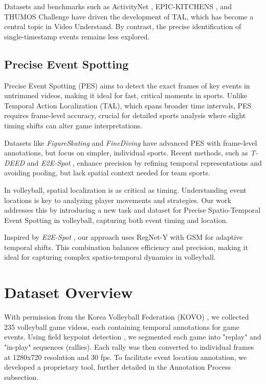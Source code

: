 \documentclass[conference]{IEEEtran}
\begin{document}
Datasets and benchmarks such as ActivityNet \cite{ActivityNet}, EPIC-KITCHENS \cite{damen2018scalingegocentricvisionepickitchens}, and THUMOS Challenge \cite{Idrees_2017} have driven the development of TAL, which has become a central topic in Video Understand. By contrast, the precise identification of single-timestamp events remains less explored.

\subsection{Precise Event Spotting}

Precise Event Spotting (PES) aims to detect the exact frames of key events in untrimmed videos, making it ideal for fast, critical moments in sports. Unlike Temporal Action Localization (TAL), which spans broader time intervals, PES requires frame-level accuracy, crucial for detailed sports analysis where slight timing shifts can alter game interpretations.

Datasets like \textit{FigureSkating} \cite{figureskating} and \textit{FineDiving} \cite{finediving} have advanced PES with frame-level annotations, but focus on simpler, individual sports. Recent methods, such as \textit{T-DEED} \cite{tdeed23} and \textit{E2E-Spot} \cite{spot22}, enhance precision by refining temporal representations and avoiding pooling, but lack spatial context needed for team sports.

In volleyball, spatial localization is as critical as timing. Understanding event locations is key to analyzing player movements and strategies. Our work addresses this by introducing a new task and dataset for Precise Spatio-Temporal Event Spotting in volleyball, capturing both event timing and location.

Inspired by \textit{E2E-Spot} \cite{spot22}, our approach uses RegNet-Y \cite{radosavovic2020designingnetworkdesignspaces} with GSM \cite{9156729} for adaptive temporal shifts. This combination balances efficiency and precision, making it ideal for capturing complex spatio-temporal dynamics in volleyball.

\section{Dataset Overview} With permission from the Korea Volleyball Federation (KOVO) \cite{kovoweb}, we collected 235 volleyball game videos, each containing temporal annotations for game events. Using field keypoint detection \cite{10312494}, we segmented each game into "replay" and "in-play" sequences (rallies). Each rally was then converted to individual frames at 1280x720 resolution and 30 fps. To facilitate event location annotation, we developed a proprietary tool, further detailed in the Annotation Process subsection.
\end{document}
